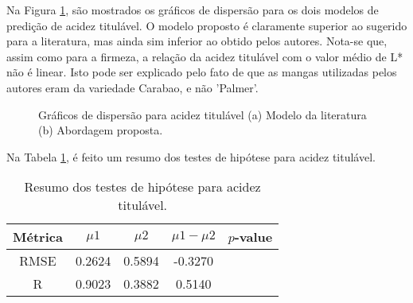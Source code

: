 Na Figura \ref{fig:scatter_acidez}, são mostrados os gráficos de dispersão para os dois modelos de predição de acidez titulável. O modelo proposto é claramente superior ao sugerido para a literatura, mas ainda sim inferior ao obtido pelos autores. Nota-se que, assim como para a firmeza, a relação da acidez titulável com o valor médio de L* não é linear. Isto pode ser explicado pelo fato de que as mangas utilizadas pelos autores eram da variedade Carabao, e não 'Palmer'. 

\begin{figure}[H]
	\centering
	\caption{Gráficos de dispersão para acidez titulável (a) Modelo da literatura (b) Abordagem proposta.}\label{fig:scatter_acidez}
\end{figure}

\color{red}Na Tabela \ref{tbl:hip_acdz}, é feito um resumo dos testes de hipótese para acidez titulável. \color{black}

\begin{table}[H]
    \centering
    \caption{Resumo dos testes de hipótese para acidez titulável.}
    \begin{tabular}{ccccc}
        \hline
         \textbf{Métrica} & $\mu1$ & $\mu2$ & $\mu1 - \mu2$ & $p$-value \\ \hline
         RMSE & 0.2624 & 0.5894  & -0.3270   & \\ 
         R    & 0.9023 & 0.3882  & 0.5140    & \\ \hline
    \end{tabular}
    \label{tbl:hip_acdz}
\end{table}